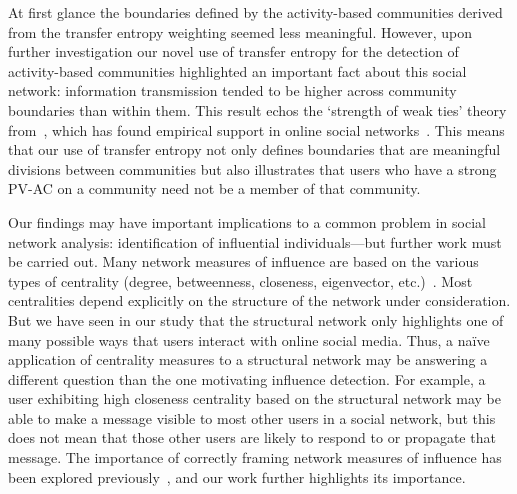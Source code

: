 

At first glance the boundaries defined by the activity-based communities derived from the transfer entropy weighting seemed less meaningful. However, upon further investigation our novel use of transfer entropy for the detection of activity-based communities highlighted an important fact about this social network: information transmission tended to be higher across community boundaries than within them. This result echos the `strength of weak ties' theory from~\cite{granovetter1973strength}, which has found empirical support in online social networks~\cite{grabowicz2012social}. This means that our use of transfer entropy not only defines boundaries that are meaningful divisions between communities but also illustrates that users who have a strong PV-AC on a community need not be a member of that community. 


Our findings may have important implications to a common problem in social network analysis: identification of influential individuals---but further work must be carried out.
 Many network measures of influence are based on the various types of centrality (degree, betweenness, closeness, eigenvector, etc.)~\cite{newman2009networks}. Most centralities depend explicitly on the structure of the network under consideration. But we have seen in our study that the structural network only highlights one of many possible ways that users interact with online social media.
Thus, a na\"ive application of centrality measures to a structural network may be answering a different question than the one motivating influence detection. For example, a user exhibiting high closeness centrality based on the structural network may be able to make a message visible to most other users in a social network, but this does not mean that those other users are likely to respond to or propagate that message. The importance of correctly framing network measures of influence has been explored previously~\cite{kitsak2010identification}, and our work further highlights its importance. 

